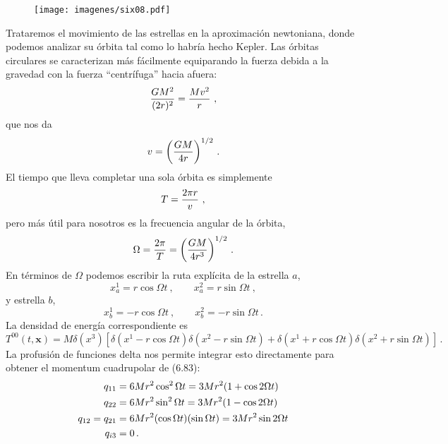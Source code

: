 \documentclass[11pt,b5paper,openany,twoside]{book}
\def\x{\mathbf{x}}
\begin{document}
\begin{figure}[h]
\centering
\texttt{[image: imagenes/six08.pdf]}
\end{figure}

\noindent
Trataremos el movimiento de las estrellas en la aproximación newtoniana, donde podemos analizar su órbita tal como lo habría hecho Kepler.
Las órbitas circulares se caracterizan más fácilmente equiparando la fuerza debida a la gravedad con la fuerza ``centrífuga'' hacia afuera:
\begin{equation}
{{GM^2}\over{(2r)^2}} = {{Mv^2}\over r}\ ,\label{6.86}
\end{equation}
que nos da
\begin{equation}
v=\left( {{GM}\over{4r}}\right)^{1/2}\,.\label{6.87}
\end{equation}
El tiempo que lleva completar una sola órbita es simplemente
\begin{equation}
T = {{2\pi r}\over v}\ ,\label{6.88}
\end{equation}
pero más útil para nosotros es la frecuencia angular de la órbita,
\begin{equation}
\Omega = {{2\pi}\over T} = \left( {{GM}\over{4r^3}}\right)^{1/2}
\,.\label{6.89}
\end{equation}
En términos de $\Omega$ podemos escribir la ruta explícita de la estrella $a$,
\begin{equation}
x^1_a = r\cos\Omega t\ ,\qquad x^2_a = r\sin\Omega t\ ,\label{6.90}
\end{equation}
y estrella $b$,
\begin{equation}
x^1_b = -r\cos\Omega t\ ,\qquad x^2_b =-r\sin\Omega t\,.\label{6.91}
\end{equation}
La densidad de energía correspondiente es
\begin{equation}
T^{00}(t,\x) = M\delta(x^3)\left[\delta(x^1-r\cos\Omega t)
\delta(x^2-r\sin\Omega t) + \delta(x^1+r\cos\Omega t)
\delta(x^2+r\sin\Omega t)\right]\,.\label{6.92}
\end{equation}
La profusión de funciones delta nos permite integrar esto directamente para obtener el momentum cuadrupolar de (6.83):
\begin{align}
q_{11}  &=  6Mr^2\cos^2\Omega t = 3Mr^2(1+\cos2\Omega t) \notag \\
q_{22}  &=  6Mr^2\sin^2\Omega t = 3Mr^2(1-\cos2\Omega t) \notag \\
q_{12} =q_{21}  &=  6Mr^2(\cos\Omega t)(\sin\Omega t) =
3Mr^2\sin2\Omega t \notag \\  q_{i3}  &=  0\,.\label{6.93}
\end{align}
\end{document}
